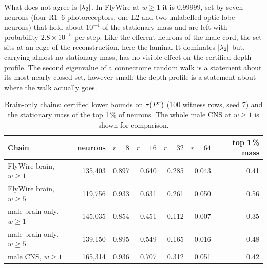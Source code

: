 What does not agree is $\lvert\lambda_2\rvert$. In FlyWire at $w\ge1$ it is $0.99999$, set by seven neurons (four
R1--6 photoreceptors, one L2 and two unlabelled optic-lobe neurons) that hold about $10^{-4}$ of the
stationary mass and are left with probability $2.8\times10^{-5}$ per step. Like the efferent
neurons of the male cord, the set sits at an edge of the reconstruction, here the lamina. It
dominates $\lvert\lambda_2\rvert$ but, carrying almost no stationary mass, has no visible effect on the certified
depth profile. The second eigenvalue of a connectome random walk is a
statement about its most nearly closed set, however small; the depth profile is a statement about
where the walk actually goes.

\begin{table}[t]
\centering
\small
\caption{Brain-only chains: certified lower bounds on $\tau(P^r)$ (100 witness rows, seed 7) and
the stationary mass of the top 1\,\% of neurons. The whole male CNS at $w\ge1$ is shown for
comparison.}
\label{tab:brains}
\begin{tabular}{@{}lrrrrrr@{}}
\toprule
Chain & neurons & $r=8$ & $r=16$ & $r=32$ & $r=64$ & top 1\,\% mass \\
\midrule
FlyWire brain, $w\ge1$ & 135{,}403 & 0.897 & 0.640 & 0.285 & 0.043 & 0.41 \\
FlyWire brain, $w\ge5$ & 119{,}756 & 0.933 & 0.631 & 0.261 & 0.050 & 0.56 \\
male brain only, $w\ge1$ & 145{,}035 & 0.854 & 0.451 & 0.112 & 0.007 & 0.35 \\
male brain only, $w\ge5$ & 139{,}150 & 0.895 & 0.549 & 0.165 & 0.016 & 0.48 \\
\addlinespace
male CNS, $w\ge1$ & 165{,}314 & 0.936 & 0.707 & 0.312 & 0.051 & 0.42 \\
\bottomrule
\end{tabular}
\end{table}
